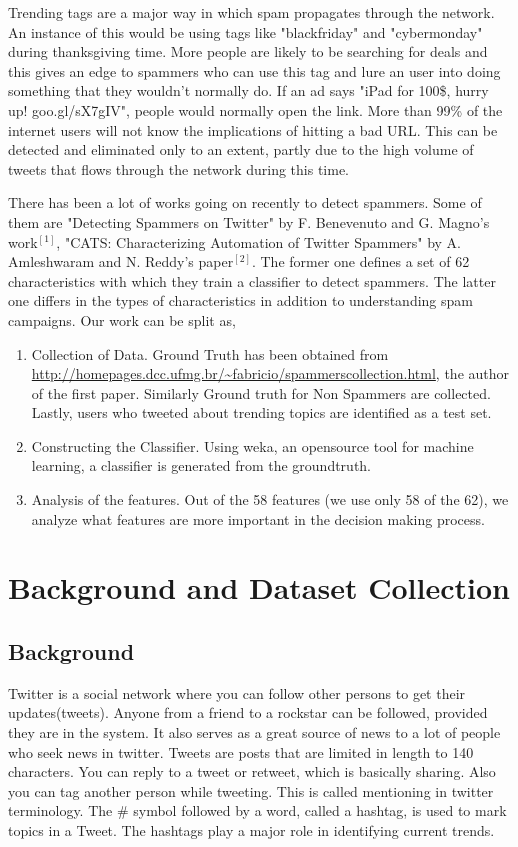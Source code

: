 \documentclass[11pt]{article}
\begin{document}
Trending tags are a major way in which spam propagates through the network. An instance of this would be using tags like "blackfriday" and "cybermonday" during thanksgiving time. More people are likely to be searching for deals and this gives an edge to spammers who can use this tag and lure an user into doing something that they wouldn't normally do. If an ad says "iPad for 100\$, hurry up! goo.gl/sX7gIV", people would normally open the link. More than 99\% of the internet users will not know the implications of hitting a bad URL. This can be detected and eliminated only to an extent, partly due to the high volume of tweets that flows through the network during this time.

There has been a lot of works going on recently to detect spammers. Some of them are "Detecting Spammers on Twitter" by F. Benevenuto and G. Magno's work$^{[1]}$, "CATS: Characterizing Automation of Twitter Spammers" by A. Amleshwaram and N. Reddy's paper$^{[2]}$. The former one defines a set of 62 characteristics with which they train a classifier to detect spammers. The latter one differs in the types of characteristics in addition to understanding spam campaigns.
\newline
\newline
Our work can be split as,
\begin{enumerate}
\item Collection of Data. Ground Truth has been obtained from \url{http://homepages.dcc.ufmg.br/~fabricio/spammerscollection.html}, the author of the first paper. Similarly Ground truth for Non Spammers are collected. Lastly, users who tweeted about trending topics are identified as a test set.
\item Constructing the Classifier. Using weka, an opensource tool for machine learning, a classifier is generated from the groundtruth.
\item Analysis of the features. Out of the 58 features (we use only 58 of the 62), we analyze what features are more important in the decision making process.
\end{enumerate}
\section{Background and Dataset Collection}
\subsection{Background}
Twitter is a social network where you can follow other persons to get their updates(tweets). Anyone from a friend to a rockstar can be followed, provided they are in the system. It also serves as a great source of news to a lot of people who seek news in twitter. Tweets are posts that are limited in length to 140 characters. You can reply to a tweet or retweet, which is basically sharing. Also you can tag another person while tweeting. This is called mentioning in twitter terminology. The \# symbol followed by a word, called a hashtag, is used to mark  topics in a Tweet. The hashtags play a major role in identifying current trends.
\end{document}
